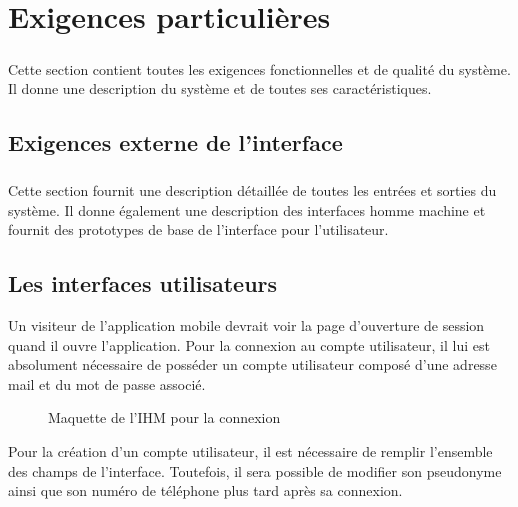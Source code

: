 \documentclass[titlepage, 12pt]{report}
\begin{document}
\chapter{Exigences particulières}

\paragraph{}Cette section contient toutes les exigences fonctionnelles et de qualité du système. Il donne une description du système et de toutes ses caractéristiques.

\section{Exigences externe de l'interface}

\paragraph{}Cette section fournit une description détaillée de toutes les entrées et sorties du système. Il donne également une description des interfaces homme machine et fournit des prototypes de base de l'interface pour l'utilisateur.

\section{Les interfaces utilisateurs}

Un visiteur de l'application mobile devrait voir la page d'ouverture de session quand il ouvre l'application. Pour la connexion au compte utilisateur, il lui est absolument nécessaire de posséder un compte utilisateur composé d'une adresse mail et du mot de passe associé.

\begin{figure}[!h]
	\caption{Maquette de l'IHM pour la connexion}
	\label{login}
	\centering
\end{figure}

\par Pour la création d'un compte utilisateur, il est nécessaire de remplir l'ensemble des champs de l'interface. Toutefois, il sera possible de modifier son pseudonyme ainsi que son numéro de téléphone plus tard après sa connexion.
\end{document}
